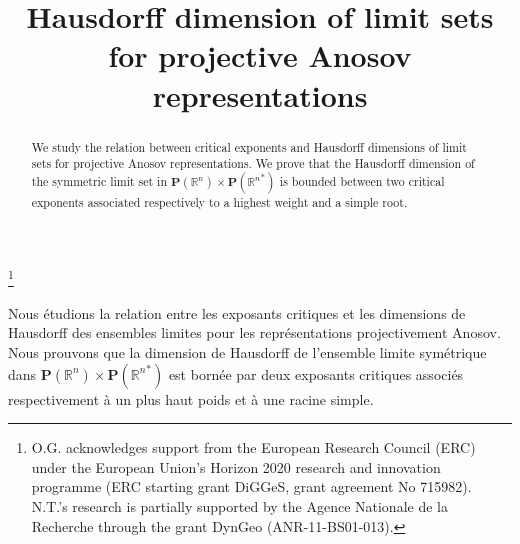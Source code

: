 \documentclass[JEP,XML,SOM,Unicode,NoEqCountersInSection,NoFloatCountersInSection,published]{cedram}
\theoremstyle{definition}
\begin{document}
\frontmatter

\title[Hausdorff dimension of limit sets for Anosov representations]{Hausdorff dimension of limit sets for projective Anosov representations}

\author[\initial{O.} \lastname{Glorieux}]{ }
\address{Lycée Chaptal\\
45 Bd des Batignolles, 75008 Paris}

\author[\initial{D.} \lastname{Monclair}]{ }
\address{Laboratoire de Mathématiques d'Orsay, Université Paris-Saclay\\ F-91405 Orsay Cedex, France}

\author[\initial{N.} \lastname{Tholozan}]{ }
\address{CNRS, ÉNS-PSL\\
45 rue d'Ulm, 75005 Paris, France}

\thanks{O.G. acknowledges support from the European Research Council (ERC) under the European Union’s Horizon 2020 research and innovation programme (ERC starting grant DiGGeS, grant agreement No 715982). N.T.'s research is partially supported by the Agence Nationale de la Recherche through the grant DynGeo (ANR-11-BS01-013).}

\begin{abstract}
We study the relation between critical exponents and Hausdorff dimensions of limit sets for projective Anosov representations. We prove that the Hausdorff dimension of the symmetric limit set in $\mathbf{P}(\mathbb{R}^{n}) \times \mathbf{P}({\mathbb{R}^{n}}^*)$ is bounded between two critical exponents associated respectively to a highest weight and a simple root.
\end{abstract}





\begin{altabstract}
Nous étudions la relation entre les exposants critiques et les dimensions de Hausdorff des ensembles limites pour les représentations projectivement Anosov. Nous prouvons que la dimen\-sion de Hausdorff de l'ensemble limite symétrique dans $\mathbf{P}(\mathbb{R}^{n}) \times \mathbf{P}({\mathbb{R}^{n}}^*)$ est bornée par deux exposants critiques associés respectivement à un plus haut poids et à une racine simple.
\end{altabstract}
\end{document}
